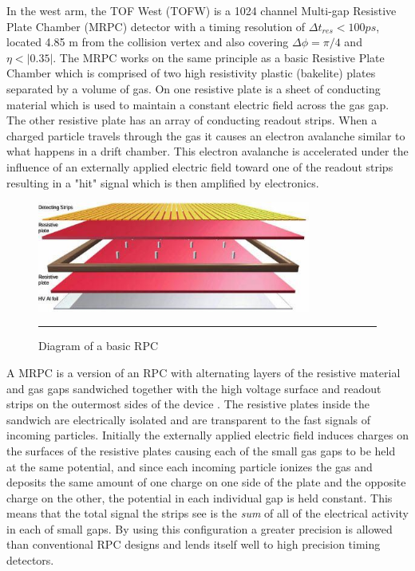 In the west arm, the TOF West (TOFW) is a 1024 channel Multi-gap Resistive Plate Chamber (MRPC) detector with a timing resolution of $\Delta t_{res} < 100 ps$, located 4.85 m from the collision vertex and also covering $\Delta\phi = \pi / 4$ and $\eta < |0.35|$. The MRPC works on the same principle as a basic Resistive Plate Chamber which is comprised of two high resistivity plastic (bakelite) plates separated by a volume of gas. On one resistive plate is a sheet of conducting material which is used to maintain a constant electric field across the gas gap. The other resistive plate has an array of conducting readout strips. When a charged particle travels through the gas it causes an electron avalanche similar to what happens in a drift chamber. This electron avalanche is accelerated under the influence of an externally applied electric field toward one of the readout strips resulting in a "hit" signal which is then amplified by electronics. 

\begin{figure}[h]
  \centering
    \includegraphics[width=0.8\textwidth]{Figures/RPClayers.jpg}
    \rule{35em}{0.5pt}
  \caption[Diagram of a basic RPC]{Diagram of a basic RPC \citep{CMSRPC}}
  \label{fig:RPCbasic}
\end{figure}

A MRPC is a version of an RPC with alternating layers of the  resistive material and gas gaps sandwiched together with the high voltage surface and readout strips on the outermost sides of the device \citep{Akindinov:2000rq}. The resistive plates inside the sandwich are electrically isolated and are transparent to the fast signals of incoming particles. Initially the externally applied electric field induces charges on the surfaces of the resistive plates causing each of the small gas gaps to be held at the same potential, and since each incoming particle ionizes the gas and deposits the same amount of one charge on one side of the plate and the opposite charge on the other, the potential in each individual gap is held constant. This means that the total signal the strips see is the \textit{sum} of all of the electrical activity in each of small gaps. By using this configuration a greater precision is allowed than conventional RPC designs and lends itself well to high precision timing detectors.

